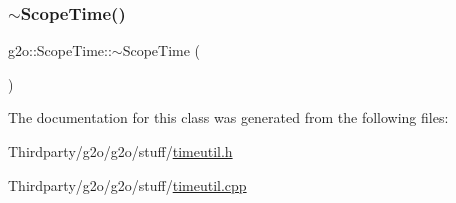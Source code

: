 \mbox{\label{classg2o_1_1_scope_time_afec269ec984e05313a28dda5eed02abc}} 
\subsubsection{\texorpdfstring{$\sim$\+Scope\+Time()}{~ScopeTime()}}
{\footnotesize\ttfamily g2o\+::\+Scope\+Time\+::$\sim$\+Scope\+Time (\begin{DoxyParamCaption}{ }\end{DoxyParamCaption})}



The documentation for this class was generated from the following files\+:\begin{DoxyCompactItemize}
\item 
Thirdparty/g2o/g2o/stuff/\mbox{\hyperlink{timeutil_8h}{timeutil.\+h}}\item 
Thirdparty/g2o/g2o/stuff/\mbox{\hyperlink{timeutil_8cpp}{timeutil.\+cpp}}\end{DoxyCompactItemize}
